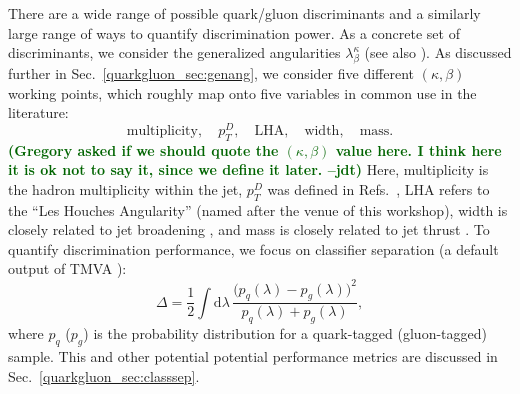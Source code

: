 \documentclass[11pt]{cernrep}
\newcommand{\jdt}[1]{\textbf{\textcolor{darkgreen}{(#1 --jdt)}}}
\begin{document}
There are a wide range of possible quark/gluon discriminants and a similarly large range of ways to quantify discrimination power.  As a concrete set of discriminants, we consider the generalized angularities $\lambda_\beta^\kappa$ \cite{Larkoski:2014pca} (see also \cite{Berger:2003iw,Almeida:2008yp,Ellis:2010rwa,Larkoski:2014uqa}).  As discussed further in Sec.~\ref{quarkgluon_sec:genang}, we consider five different $(\kappa, \beta)$ working points, which roughly map onto five variables in common use in the literature:
\begin{equation}
\text{multiplicity}, \quad p_T^D, \quad \text{LHA}, \quad \text{width} 
, \quad \text{mass} .
\end{equation}
\jdt{Gregory asked if we should quote the $(\kappa,\beta)$ value here.  I think here it is ok not to say it, since we define it later.} Here, multiplicity is the hadron multiplicity within the
jet, $p_T^D$ was defined in
Refs.~\cite{Pandolfi:1480598,Chatrchyan:2012sn}, LHA refers to the
``Les Houches Angularity'' (named after the venue of this workshop),
width is closely related to jet broadening
\cite{Catani:1992jc,Rakow:1981qn,Ellis:1986ig}, and mass is closely
related to jet thrust \cite{Farhi:1977sg}.  To quantify discrimination
performance, we focus on classifier separation (a default output of
TMVA \cite{2007physics...3039H}):
\begin{equation}
\Delta =  \frac{1}{2} \int \text{d} \lambda \, \frac{\bigl(p_q(\lambda) - p_g(\lambda)\bigr)^2}{p_q(\lambda) + p_g(\lambda)},
\end{equation}
where $p_q$ ($p_g$) is the probability distribution for a quark-tagged
(gluon-tagged) sample.  This and other potential potential performance metrics are discussed in
Sec.~\ref{quarkgluon_sec:classsep}.
\end{document}
